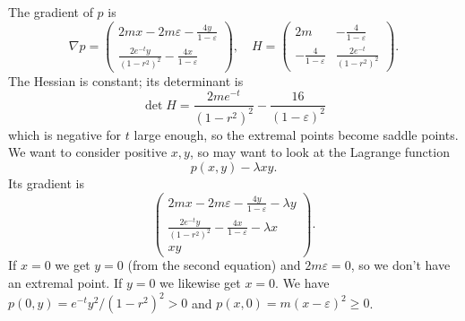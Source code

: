 \documentclass[10pt,a4paper]{amsart}
\def\eps{\varepsilon}
\begin{document}
The gradient of $p$ is
$$
\nabla p
= \begin{pmatrix}
2mx - 2 m \varepsilon - \frac{4y}{1-\varepsilon}
\\
\frac{2e^{-t}y}{(1-r^2)^2} - \frac{4x}{1-\varepsilon}
\end{pmatrix},
\quad
H =
\begin{pmatrix}
2m & - \frac{4}{1-\eps}
\\
-\frac{4}{1-\eps} & \frac{2e^{-t}}{(1-r^2)^2}
\end{pmatrix}.
$$
The Hessian is constant; its determinant is
$$
\det H
= \frac{2me^{-t}}{(1-r^2)^2} - \frac{16}{(1-\eps)^2}
$$
which is negative for $t$ large enough, so the extremal points become saddle points.
We want to consider positive $x,y$, so may want to look at the Lagrange function
$$
p(x,y) - \lambda xy.
$$
Its gradient is
$$
\begin{pmatrix}
2mx - 2 m \varepsilon - \frac{4y}{1-\varepsilon} - \lambda y
\\
\frac{2e^{-t}y}{(1-r^2)^2} - \frac{4x}{1-\varepsilon} - \lambda x
\\
xy
\end{pmatrix}.
$$
If $x = 0$ we get $y = 0$ (from the second equation) and $2m\eps = 0$, so
we don't have an extremal point.
If $y = 0$ we likewise get $x = 0$.
We have $p(0,y) = e^{-t}y^2 / (1-r^2)^2 > 0$ and $p(x,0) = m(x-\eps)^2 \geq 0$.
\end{document}
